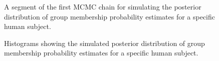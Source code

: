 \begin{DoubleSpace*}
\begin{figure}[H]
	\caption[A segment of the first MCMC chain for simulating the posterior distribution of group membership probability estimates for a specific human subject. ]{\DoubleSpacing A segment of the first MCMC chain for simulating the posterior distribution of group membership probability estimates for a specific human subject.  \label{fig:ptid2010MCMC} }
\end{figure}

\begin{figure}[H]
	\caption[Histograms showing the simulated posterior distribution of group membership probability estimates for a specific human subject]{\DoubleSpacing Histograms showing the simulated posterior distribution of group membership probability estimates for a specific human subject. \label{fig:ptid2010Hist} }
\end{figure}
 

\end{DoubleSpace*}
